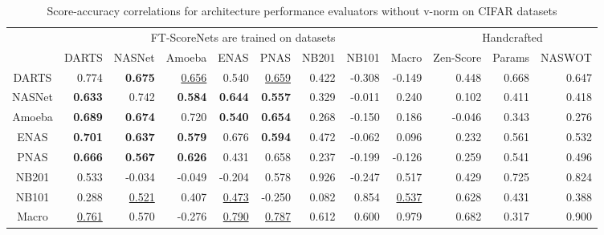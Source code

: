 \documentclass[lettersize,journal]{IEEEtran}
\begin{document}
          \begin{table*}
            \caption{Score-accuracy correlations for architecture performance evaluators without v-norm on CIFAR datasets}
            \label{tab:score_accuracy_correlation_not_vnorm}
            \centering
            \begin{tabular}{c|rrrrrrrr|rrr}
            \toprule
                &\multicolumn{8}{c|}{FT-ScoreNets are trained on datasets \cite{nds, nb201, nb101, macro}}& \multicolumn{3}{c}{Handcrafted} \\
                \cmidrule(r){2-9} \cmidrule(r){10-12}
                & DARTS & NASNet & Amoeba & ENAS & PNAS & NB201 & NB101 & Macro & Zen-Score \cite{Zen-NAS}& Params & NASWOT \cite{naswot}\\
                \midrule
                DARTS & 0.774 & \textbf{0.675} & \underline{0.656} & 0.540 & \underline{0.659} & 0.422 & -0.308 & -0.149  &0.448 & 0.668 & 0.647\\
                NASNet & \textbf{0.633} & 0.742 & \textbf{0.584} & \textbf{0.644} & \textbf{0.557} & 0.329 & -0.011 & 0.240 &0.102 & 0.411 & 0.418\\
                Amoeba & \textbf{0.689} & \textbf{0.674} & 0.720 & \textbf{0.540} & \textbf{0.654} & 0.268 & -0.150 & 0.186 &-0.046 & 0.343 & 0.276\\
                ENAS & \textbf{0.701} & \textbf{0.637} & \textbf{0.579} & 0.676 & \textbf{0.594} & 0.472 & -0.062 & 0.096& 0.232 & 0.561 & 0.532\\
                PNAS & \textbf{0.666} & \textbf{0.567} & \textbf{0.626} & 0.431 & 0.658 & 0.237 & -0.199 & -0.126 &  0.259 & 0.541 & 0.496\\
                NB201 & 0.533 & -0.034 & -0.049 & -0.204 & 0.578 & 0.926 & -0.247 & 0.517 & 0.429 & 0.725 & 0.824\\
                NB101 & 0.288 & \underline{0.521} & 0.407 & \underline{0.473} & -0.250 & 0.082 & 0.854 & \underline{0.537}& 0.628 & 0.431 & 0.388\\
                Macro & \underline{0.761} & 0.570 & -0.276 & \underline{0.790} & \underline{0.787} & 0.612 & 0.600 & 0.979 &0.682 & 0.317 & 0.900 \\
                
            \bottomrule
          \end{tabular}
          \end{table*}
          
\end{document}
